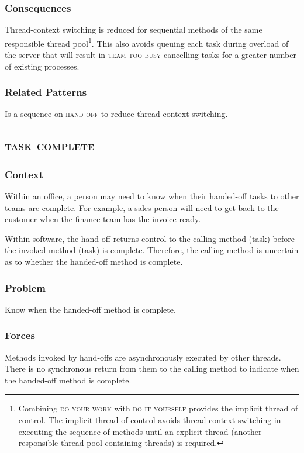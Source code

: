 \documentclass[prodmode]{style/acmlarge}
\begin{document}
\subsubsection*{Consequences} Thread-context switching is reduced for sequential
methods of the same responsible thread pool\footnote{Combining \textsc{do your
work} with \textsc{do it yourself} provides the implicit thread of control.  The
implicit thread of control avoids thread-context switching in executing the
sequence of methods until an explicit thread (another responsible thread pool
containing threads) is required.}.  This also avoids queuing each task during
overload of the server that will result in \textsc{team too busy} cancelling
tasks for a greater number of existing processes.

\subsubsection*{Related Patterns} Is a sequence on \textsc{hand-off} to reduce
thread-context switching.



\subsection{\textsc{\textbf{task complete}}}

\subsubsection*{Context} Within an office, a person may need to know when their
handed-off tasks to other teams are complete.  For example, a sales person will
need to get back to the customer when the finance team has the invoice ready.

Within software, the hand-off returns control to the calling method (task)
before the invoked method (task) is complete.  Therefore, the calling method is
uncertain as to whether the handed-off method is complete.

\subsubsection*{\textbf{Problem}} Know when the handed-off method is complete.

\subsubsection*{Forces} Methods invoked by hand-offs are asynchronously executed
by other threads.  There is no synchronous return from them to the calling
method to indicate when the handed-off method is complete.
\end{document}
